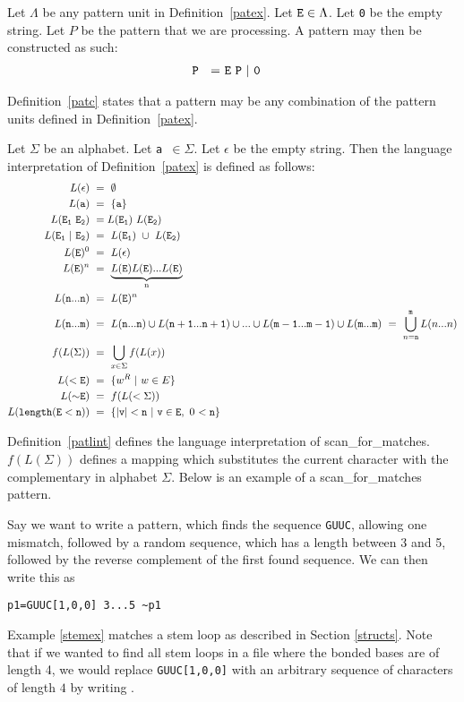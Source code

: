 \begin{mydef}\label{patc}
Let $\Lambda$ be any pattern unit in Definition~\ref{patex}. Let ${\tt E}\in\Lambda$.
Let {\tt 0} be the empty string. Let $P$ be the pattern that we are processing.
A pattern may then be constructed as such: 
\begin{align*}
{\tt P~}~=&~{\tt E~P~|~0}
\end{align*}
\end{mydef}
Definition~\ref{patc} states that a pattern may be any combination of the pattern 
units defined in Definition~\ref{patex}.
\begin{mydef}\label{patlint}
Let $\Sigma$ be an alphabet. Let {\tt a $\in\Sigma$}. Let $\epsilon$ be the empty 
string.
Then the language interpretation of Definition~\ref{patex} is defined as follows:
\begin{align*}
L({\tt \epsilon})~&=~\emptyset\\
L({\tt a})~&=~\{{\tt a}\}\\
L({\tt E_1~E_2})~&=L({\tt E_1})~L({\tt E_2})\\
L({\tt E_1~|~E_2})~&=~L({\tt E}_{\tt 1})~\cup~L({\tt E}_{\tt 2})\\
L({\tt E})^0~&=~L({\tt \epsilon})\\
L({\tt E})^n~&=~\underbrace{L({\tt E})L({\tt E})...L({\tt E})}_\text{n}\\
L({\tt n...n})~&=~L({\tt E})^n\\
L({\tt n...m})~&=~L({\tt n...n})\cup L({\tt n+1...n+1})\cup...\cup L({\tt m-1...m-1})\cup L({\tt m...m})~=~\bigcup\limits_{n={\tt n}}^{\tt m} L(n...n)\\
f(L(\Sigma))~&=~\bigcup\limits_{x\in\Sigma} f(L(x))\\ %
L({\tt <E})~&=~\{w^R~|~w\in E\}\\
L({\tt {\sim}E})~&=~f(L(<\Sigma))\\
L({\tt length(E<n)} )~&=~\{{\tt |v|<n~|~v\in E},~0~{\tt <n}\}
\end{align*}
\end{mydef}
Definition~\ref{patlint} defines the language interpretation of 
scan\_for\_matches. $f(L(\Sigma))$ defines a mapping \cite[p. 60]{Hopcroft1979} 
which substitutes the current character with the complementary in alphabet 
$\Sigma$.
Below is an example of a scan\_for\_matches pattern.
\begin{myex}\label{stemex}
Say we want to write a pattern, which finds the sequence {\tt GUUC}, allowing 
one mismatch, followed by a random sequence, which has a length between 3 and 5, 
followed by the reverse complement of the first found sequence. We can 
then write this as \begin{center}
{\tt p1=GUUC[1,0,0] 3...5 \textasciitilde p1}
\end{center}
\end{myex}
Example \ref{stemex} matches a stem loop as described in Section 
\ref{structs}. Note that if we wanted to find all stem loops in a file where 
the bonded bases are of length 
4, we would replace {\tt GUUC[1,0,0]} with an arbitrary sequence of characters of length $4$ 
by writing {}.
